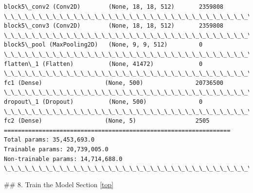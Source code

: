 \documentclass[11pt]{article}
\begin{document}
\begin{Verbatim}[commandchars=\\\{\}]
block5\_conv2 (Conv2D)        (None, 18, 18, 512)       2359808   
\_\_\_\_\_\_\_\_\_\_\_\_\_\_\_\_\_\_\_\_\_\_\_\_\_\_\_\_\_\_\_\_\_\_\_\_\_\_\_\_\_\_\_\_\_\_\_\_\_\_\_\_\_\_\_\_\_\_\_\_\_\_\_\_\_
block5\_conv3 (Conv2D)        (None, 18, 18, 512)       2359808   
\_\_\_\_\_\_\_\_\_\_\_\_\_\_\_\_\_\_\_\_\_\_\_\_\_\_\_\_\_\_\_\_\_\_\_\_\_\_\_\_\_\_\_\_\_\_\_\_\_\_\_\_\_\_\_\_\_\_\_\_\_\_\_\_\_
block5\_pool (MaxPooling2D)   (None, 9, 9, 512)         0         
\_\_\_\_\_\_\_\_\_\_\_\_\_\_\_\_\_\_\_\_\_\_\_\_\_\_\_\_\_\_\_\_\_\_\_\_\_\_\_\_\_\_\_\_\_\_\_\_\_\_\_\_\_\_\_\_\_\_\_\_\_\_\_\_\_
flatten\_1 (Flatten)          (None, 41472)             0         
\_\_\_\_\_\_\_\_\_\_\_\_\_\_\_\_\_\_\_\_\_\_\_\_\_\_\_\_\_\_\_\_\_\_\_\_\_\_\_\_\_\_\_\_\_\_\_\_\_\_\_\_\_\_\_\_\_\_\_\_\_\_\_\_\_
fc1 (Dense)                  (None, 500)               20736500  
\_\_\_\_\_\_\_\_\_\_\_\_\_\_\_\_\_\_\_\_\_\_\_\_\_\_\_\_\_\_\_\_\_\_\_\_\_\_\_\_\_\_\_\_\_\_\_\_\_\_\_\_\_\_\_\_\_\_\_\_\_\_\_\_\_
dropout\_1 (Dropout)          (None, 500)               0         
\_\_\_\_\_\_\_\_\_\_\_\_\_\_\_\_\_\_\_\_\_\_\_\_\_\_\_\_\_\_\_\_\_\_\_\_\_\_\_\_\_\_\_\_\_\_\_\_\_\_\_\_\_\_\_\_\_\_\_\_\_\_\_\_\_
fc2 (Dense)                  (None, 5)                 2505      
=================================================================
Total params: 35,453,693.0
Trainable params: 20,739,005.0
Non-trainable params: 14,714,688.0
\_\_\_\_\_\_\_\_\_\_\_\_\_\_\_\_\_\_\_\_\_\_\_\_\_\_\_\_\_\_\_\_\_\_\_\_\_\_\_\_\_\_\_\_\_\_\_\_\_\_\_\_\_\_\_\_\_\_\_\_\_\_\_\_\_

    \end{Verbatim}

     \#\# 8. Train the Model Section \ref{top}
\end{document}
